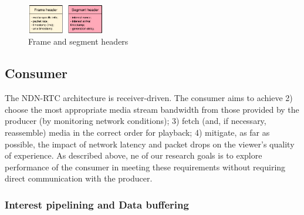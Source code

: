 \documentclass{icn/sig-alternate-2012} %
\newcommand{\ndnrtcName}{NDN-RTC} %
\begin{document}

%

%


\begin{figure}[t!]
\centering
\includegraphics[width=0.3\textwidth]{data-struct}
\vspace{-4pt}
\caption{Frame and segment headers}
\label{fig:data-struct}
\end{figure}

\subsection{Consumer}

The \ndnrtcName{} architecture is receiver-driven. The consumer aims to achieve 2) choose the most appropriate media stream bandwidth from those  provided by the producer (by monitoring network conditions); 3) fetch (and, if necessary, reassemble) media in the correct order for playback; 4) mitigate, as far as possible, the impact of network latency and packet drops on the viewer's quality of experience.  As described above, ne of our research goals is to explore performance of the consumer in meeting these requirements without requiring direct communication with the producer.

\subsubsection{Interest pipelining and Data buffering}
\end{document}
